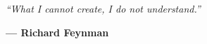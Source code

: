
\thispagestyle{empty}
\vspace*{0.35\textheight}
\begin{flushright}
    \textit{``What I cannot create, I do not understand.''}

    \vspace{0.5cm}
    \textbf{— Richard Feynman}
\end{flushright}
\vfill
\newpage